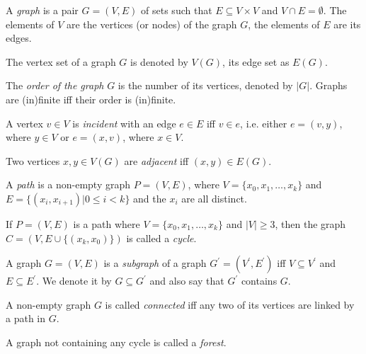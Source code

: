 \begin{definition}
  A {\em graph} is a pair $G = (V,E)$ of sets such that $E\subseteq V\times V$ and $V\cap E = \emptyset$. The elements of $V$ are the vertices (or nodes) of the graph $G$, the elements of $E$ are its edges.
\end{definition}

The vertex set of a graph $G$ is denoted by $V(G)$, its edge set as $E(G)$.

\begin{definition}
  The {\em order of the graph} $G$ is the number of its vertices, denoted by $|G|$. Graphs are (in)finite iff their order is (in)finite.
\end{definition}

\begin{definition}
  A vertex $v\in V$ is {\em incident} with an edge $e\in E$ iff $v\in e$, i.e. either $e=(v,y)$, where $y\in V$ or $e=(x,v)$, where $x\in V$.
\end{definition}

\begin{definition}
  Two vertices $x,y\in V(G)$ are {\em adjacent} iff $(x,y)\in E(G)$.
\end{definition}

\begin{definition}
  A {\em path} is a non-empty graph $P=(V,E)$, where $V=\{x_0, x_1, \ldots, x_k\}$ and $E=\{(x_i,x_{i+1})|0\leq i < k\}$ and the $x_i$ are all distinct.
\end{definition}

\begin{definition}
  If $P=(V,E)$ is a path where $V=\{x_0, x_1, \ldots, x_k\}$ and $|V|\geq 3$, then the graph $C = (V,E\cup\{(x_k,x_0)\})$ is called a {\em cycle}. 
\end{definition}

\begin{definition}
  A graph $G=(V,E)$ is a {\em subgraph} of a graph $G^\prime = (V^\prime, E^\prime)$ iff $V\subseteq V^\prime$ and $E\subseteq E^\prime$. We denote it by $G\subseteq G^\prime$ and also say that $G^\prime$ contains $G$.
\end{definition}

\begin{definition}
  A non-empty graph $G$ is called {\em connected} iff any two of its vertices are linked by a path in $G$.
\end{definition}

\begin{definition}
  A graph not containing any cycle is called a {\em forest}.
\end{definition}

